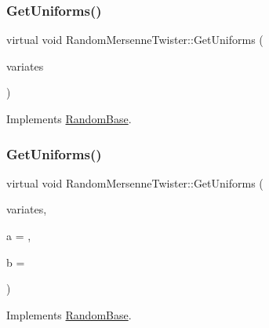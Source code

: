 \hypertarget{classRandomMersenneTwister_afd574ab3efab7a722a230bfc5680dea8}{}\label{classRandomMersenneTwister_afd574ab3efab7a722a230bfc5680dea8} 
\subsubsection{\texorpdfstring{Get\+Uniforms()}{GetUniforms()}\hspace{0.1cm}{\footnotesize\ttfamily [1/2]}}
{\footnotesize\ttfamily virtual void Random\+Mersenne\+Twister\+::\+Get\+Uniforms (\begin{DoxyParamCaption}\item[{\hyperlink{classMJArray}{M\+J\+Array} \&}]{variates }\end{DoxyParamCaption})\hspace{0.3cm}{\ttfamily [virtual]}}



Implements \hyperlink{classRandomBase_aa061fb77f53969f6fbe40c7454c69eb9}{Random\+Base}.

\hypertarget{classRandomMersenneTwister_a6ee46c33d00d07921765033a9b0c471a}{}\label{classRandomMersenneTwister_a6ee46c33d00d07921765033a9b0c471a} 
\subsubsection{\texorpdfstring{Get\+Uniforms()}{GetUniforms()}\hspace{0.1cm}{\footnotesize\ttfamily [2/2]}}
{\footnotesize\ttfamily virtual void Random\+Mersenne\+Twister\+::\+Get\+Uniforms (\begin{DoxyParamCaption}\item[{std\+::vector$<$ double $>$ \&}]{variates,  }\item[{double}]{a = {},  }\item[{double}]{b = {} }\end{DoxyParamCaption})\hspace{0.3cm}{\ttfamily [virtual]}}



Implements \hyperlink{classRandomBase_a3bbf85695dbb1a9462a2b6c3f10af969}{Random\+Base}.

